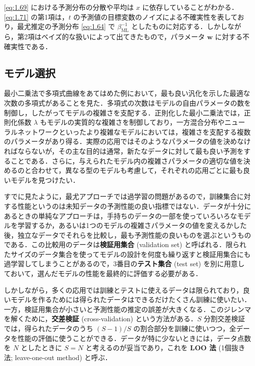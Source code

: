 \documentclass[uplatex,a4paper,oneside,openany,dvipdfmx]{jsarticle}
\numberwithin{equation}{section}
\theoremstyle{mystyle} %
\newcommand{\tb}[1]{\textbf{#1}}
\newcommand{\bs}[1]{\boldsymbol{#1}}
\begin{document}
\eqref{eq:1.69} における予測分布の分散や平均は $x$ に依存していることがわかる．\eqref{eq:1.71} の第1項は，$t$ の予測値の目標変数のノイズによる不確実性を表しており，最尤推定の予測分布 \eqref{eq:1.64} で $\beta_{\text{ML}}^{-1}$ としたものに対応する．しかしながら，第2項はベイズ的な扱いによって出てきたもので，パラメータ $\bs{w}$ に対する不確実性である．

\subsection{モデル選択} \label{subsec:model_selection}

最小二乗法で多項式曲線をあてはめた例において，最も良い汎化を示した最適な次数の多項式があることを見た．多項式の次数はモデルの自由パラメータの数を制御し，したがってモデルの複雑さを支配する．正則化した最小二乗法では，正則化係数 $\lambda$ もモデルの実質的な複雑さを制御しており，一方混合分布やニューラルネットワークといったより複雑なモデルにおいては，複雑さを支配する複数のパラメータがあり得る．実際の応用ではそのようなパラメータの値を決めなければならないが，その主な目的は通常，新たなデータに対して最も良い予測をすることである．さらに，与えられたモデル内の複雑さパラメータの適切な値を決めるのと合わせて，異なる型のモデルも考慮して，それぞれの応用ごとに最も良いモデルを見つけたい．

すでに見たように，最尤アプローチでは過学習の問題があるので，訓練集合に対する性能というのは未知データの予測性能の良い指標ではない．データが十分にあるときの単純なアプローチは，手持ちのデータの一部を使っていろいろなモデルを学習するか，あるいは1つのモデルの複雑さパラメータの値を変えるかした後，独立なデータでそれらを比較し，最も予測性能の良いものを選ぶというものである．この比較用のデータは\tb{検証用集合} (validation set) と呼ばれる．限られたサイズのデータ集合を使ってモデルの設計を何度も繰り返すと検証用集合にも過学習してしまうことがあるので，3番目の\tb{テスト集合} (test set) を別に用意しておいて，選んだモデルの性能を最終的に評価する必要がある．

しかしながら，多くの応用では訓練とテストに使えるデータは限られており，良いモデルを作るためには得られたデータはできるだけたくさん訓練に使いたい．一方，検証用集合が小さいと予測性能の推定の誤差が大きくなる．このジレンマを解くために，\tb{交差検証} (cross-validation) という方法がある．$S$ 分割交差検証では，得られたデータのうち $(S-1)/S$ の割合部分を訓練に使いつつ，全データを性能の評価に使うことができる．データが特に少ないときには，データ点数を $N$ としたときに $S=N$ と考えるのが妥当であり，これを \tb{LOO 法} (1個抜き法; leave-one-out method) と呼ぶ．
\end{document}
